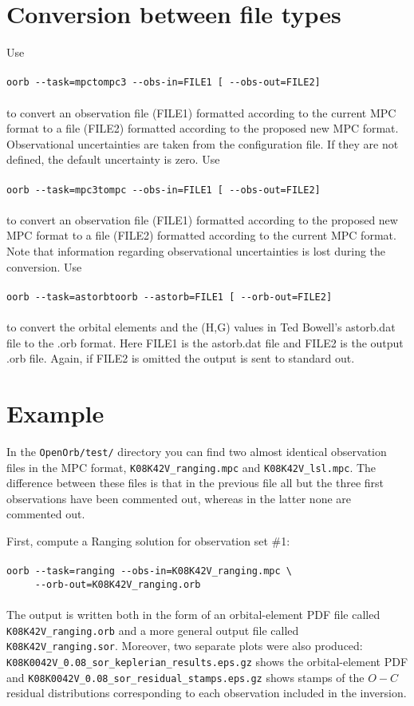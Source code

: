 \documentclass[12pt,english,twoside,a4paper]{report}
\begin{document}
\section{Conversion between file types}

Use \\ \\
\verb|oorb --task=mpctompc3 --obs-in=FILE1 [ --obs-out=FILE2]| \\ \\
to convert an observation file (FILE1) formatted according to the
current MPC format to a file (FILE2) formatted according to the
proposed new MPC format. Observational uncertainties are taken from
the configuration file. If they are not defined, the default
uncertainty is zero. Use \\ \\
\verb|oorb --task=mpc3tompc --obs-in=FILE1 [ --obs-out=FILE2]| \\ \\
to convert an observation file (FILE1) formatted according to the
proposed new MPC format to a file (FILE2) formatted according to the
current MPC format. Note that information regarding observational
uncertainties is lost during the conversion. Use \\ \\
\verb|oorb --task=astorbtoorb --astorb=FILE1 [ --orb-out=FILE2]| \\ \\
to convert the orbital elements and the (H,G) values in Ted Bowell's
astorb.dat file to the .orb format. Here FILE1 is the astorb.dat file
and FILE2 is the output .orb file. Again, if FILE2 is omitted the
output is sent to standard out.

\section{Example}

In the \verb|OpenOrb/test/| directory you can find two almost
identical observation files in the MPC format,
\verb|K08K42V_ranging.mpc| and \verb|K08K42V_lsl.mpc|. The difference
between these files is that in the previous file all but the three
first observations have been commented out, whereas in the latter none
are commented out.

First, compute a Ranging solution for observation set \#1:
\\ \\ 
\verb|oorb --task=ranging --obs-in=K08K42V_ranging.mpc \| \\
\verb|     --orb-out=K08K42V_ranging.orb|
\\ \\
The output is written both in the form of an orbital-element
PDF file called \verb|K08K42V_ranging.orb| and a more general
output file called \\ \verb|K08K42V_ranging.sor|. Moreover, two separate
plots were also produced:
\verb|K08K0042V_0.08_sor_keplerian_results.eps.gz| shows the
orbital-element PDF and
\verb|K08K0042V_0.08_sor_residual_stamps.eps.gz| shows stamps of the
$O-C$ residual distributions corresponding to each observation
included in the inversion.
\end{document}
